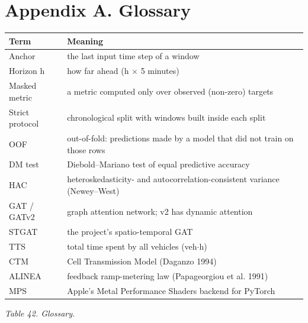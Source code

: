 \documentclass[10pt,a4paper]{article}
\begin{document}
\section*{Appendix A. Glossary}
{\scriptsize\renewcommand{\arraystretch}{1.15}\begin{longtable}{>{\raggedright\arraybackslash}p{0.2200\dimexpr\linewidth-4\tabcolsep\relax}>{\raggedright\arraybackslash}p{0.7800\dimexpr\linewidth-4\tabcolsep\relax}}
\toprule
\textbf{Term} & \textbf{Meaning} \\
\midrule
\endhead
\bottomrule
\endlastfoot
Anchor & the last input time step of a window \\
Horizon h & how far ahead (h \ensuremath{\times} 5 minutes) \\
Masked metric & a metric computed only over observed (non-zero) targets \\
Strict protocol & chronological split with windows built inside each split \\
OOF & out-of-fold: predictions made by a model that did not train on those rows \\
DM test & Diebold--Mariano test of equal predictive accuracy \\
HAC & heteroskedasticity- and autocorrelation-consistent variance (Newey--West) \\
GAT /\allowbreak{} GATv2 & graph attention network; v2 has dynamic attention \\
STGAT & the project's spatio-temporal GAT \\
TTS & total time spent by all vehicles (veh\ensuremath{\cdot}h) \\
CTM & Cell Transmission Model (Daganzo 1994) \\
ALINEA & feedback ramp-metering law (Papageorgiou et al. 1991) \\
MPS & Apple's Metal Performance Shaders backend for PyTorch \\
\end{longtable}}
{\footnotesize\itshape Table 42. Glossary.}\par\medskip
\end{document}
